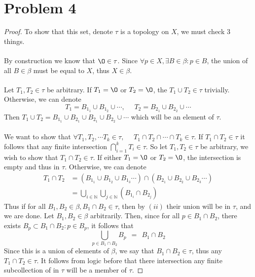 \documentclass{article}
\begin{document}
\section*{Problem 4}
\begin{proof}
    To show that this set, denote $\tau$ is a topology on $X$, we must check 3 things.
    \\\\
    By construction we know that $\O \in \tau$.
    Since $\forall p \in X, \exists B \in \beta : p \in B$, the union of all $B \in \beta$ must be equal to $X$, thus $X \in \beta$.
    \\\\
    Let $T_1, T_2 \in \tau$ be arbitrary.
    If $T_1 = \O$ or $T_2 = \O$, the $T_1 \cup T_2 \in \tau$ trivially.
    Otherwise, we can denote
    \[ T_1 = B_{1_1} \cup B_{1_2} \cup \cdots, \ \ \ \ \ \ T_2 = B_{2_1} \cup B_{2_2} \cup \cdots \]
    Then $T_1 \cup T_2 = B_{1_1} \cup B_{2_1} \cup B_{2_1} \cup B_{2_2} \cup \cdots$ which will be an element of $\tau$.
    \\\\
    We want to show that $\forall T_1, T_2 , \cdots T_k \in \tau, \ \ \ \ \ \ T_1 \cap T_2 \cap \cdots \cap T_k \in \tau$.
    If $T_1 \cap T_2 \in \tau$ it follows that any finite intersection $\bigcap_{i = 1}^kT_i \in \tau$.
    So let $T_1, T_2 \in \tau$ be arbitrary, we wish to show that $T_1 \cap T_2 \in \tau$.
    If either $T_1 = \O$ or $T_2 = \O$, the intersection is empty and thus in $\tau$.
    Otherwise, we can denote
    \begin{align*}
        T_1 \cap T_2 
        & = (B_{1_1} \cup B_{1_2} \cup B_{1_3} \cdots ) \cap (B_{2_1} \cup B_{2_2} \cup B_{2_3} \cdots ) \\ 
        & = \bigcup_{i \in \mathbb{N}} \bigcup_{j \in \mathbb{N}}(B_{1_i} \cap B_{2_j})
    \end{align*}
    Thus if for all $B_1, B_2 \in \beta, B_1 \cap B_2 \in \tau$, then by $(ii)$ their union will be in $\tau$, and we are done.
    Let $B_1, B_2 \in \beta$ arbitrarily.
    Then, since for all $p \in B_1 \cap B_2$, there exists $B_p \subset B_1 \cap B_2 : p \in B_p$, it follows that
    \[ \bigcup_{p \in B_1 \cap B_2}B_p \ \ = \ \  B_1 \cap B_2\]
    Since this is a union of elements of $\beta$, we say that $B_1 \cap B_2 \in \tau$, thus any $T_1 \cap T_2 \in \tau$.
    It follows from logic before that there intersection any finite subcollection of in $\tau$ will be a member of $\tau$.
\end{proof}
\end{document}
